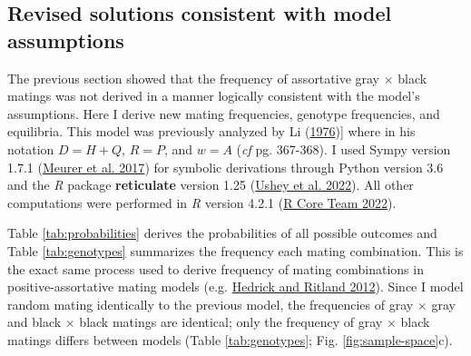 \documentclass[
]{article}
\begin{document}
\hypertarget{revised-solutions-consistent-with-model-assumptions}{%
\subsection{Revised solutions consistent with model assumptions}\label{revised-solutions-consistent-with-model-assumptions}}

The previous section showed that the frequency of assortative gray \(\times\) black matings was not derived in a manner logically consistent with the model's assumptions. Here I derive new mating frequencies, genotype frequencies, and equilibria. This model was previously analyzed by Li (\protect\hyperlink{ref-li_first_1976}{1976}){]} where in his notation \(D = H + Q\), \(R = P\), and \(w = A\) (\emph{cf} pg. 367-368). I used Sympy version 1.7.1 (\protect\hyperlink{ref-meurer_sympy:_2017}{Meurer et al. 2017}) for symbolic derivations through Python version 3.6 and the \emph{R} package \textbf{reticulate} version 1.25 (\protect\hyperlink{ref-ushey_reticulate_2022}{Ushey et al. 2022}). All other computations were performed in \emph{R} version 4.2.1 (\protect\hyperlink{ref-r_core_team_r_2022}{R Core Team 2022}).

Table \ref{tab:probabilities} derives the probabilities of all possible outcomes and Table \ref{tab:genotypes} summarizes the frequency each mating combination. This is the exact same process used to derive frequency of mating combinations in positive-assortative mating models (e.g. \protect\hyperlink{ref-hedrick_population_2012}{Hedrick and Ritland 2012}). Since I model random mating identically to the previous model, the frequencies of gray \(\times\) gray and black \(\times\) black matings are identical; only the frequency of gray \(\times\) black matings differs between models (Table \ref{tab:genotypes}; Fig. \ref{fig:sample-space}c).
\end{document}
